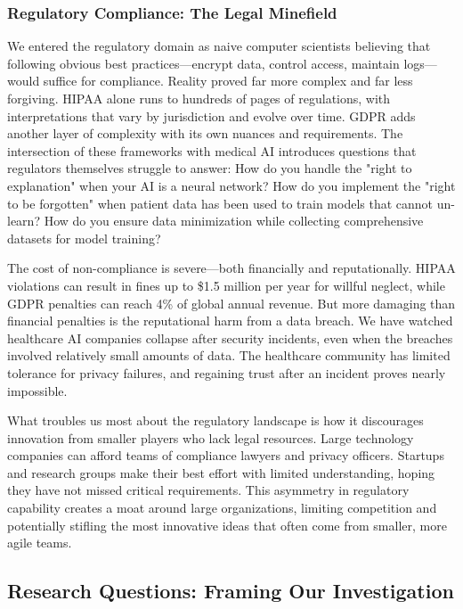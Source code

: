\documentclass[12pt,a4paper]{article}
\begin{document}
\subsubsection{Regulatory Compliance: The Legal Minefield}

We entered the regulatory domain as naive computer scientists believing that following obvious best practices—encrypt data, control access, maintain logs—would suffice for compliance. Reality proved far more complex and far less forgiving. HIPAA alone runs to hundreds of pages of regulations, with interpretations that vary by jurisdiction and evolve over time. GDPR adds another layer of complexity with its own nuances and requirements. The intersection of these frameworks with medical AI introduces questions that regulators themselves struggle to answer: How do you handle the "right to explanation" when your AI is a neural network? How do you implement the "right to be forgotten" when patient data has been used to train models that cannot un-learn? How do you ensure data minimization while collecting comprehensive datasets for model training?

The cost of non-compliance is severe—both financially and reputationally. HIPAA violations can result in fines up to \$1.5 million per year for willful neglect, while GDPR penalties can reach 4\% of global annual revenue. But more damaging than financial penalties is the reputational harm from a data breach. We have watched healthcare AI companies collapse after security incidents, even when the breaches involved relatively small amounts of data. The healthcare community has limited tolerance for privacy failures, and regaining trust after an incident proves nearly impossible.

What troubles us most about the regulatory landscape is how it discourages innovation from smaller players who lack legal resources. Large technology companies can afford teams of compliance lawyers and privacy officers. Startups and research groups make their best effort with limited understanding, hoping they have not missed critical requirements. This asymmetry in regulatory capability creates a moat around large organizations, limiting competition and potentially stifling the most innovative ideas that often come from smaller, more agile teams.

\subsection{Research Questions: Framing Our Investigation}
\end{document}
